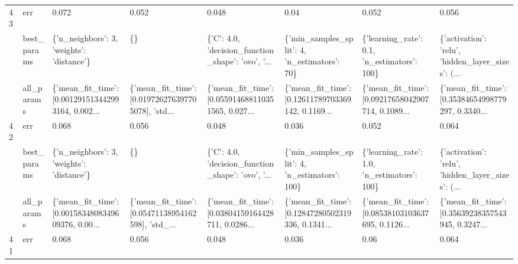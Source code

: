 \begin{tabular}{llllllll}
43 & err &                                              0.072 &                                              0.052 &                                              0.048 &                                               0.04 &                                              0.052 &                                              0.056 \\
   & best\_params &          \{'n\_neighbors': 3, 'weights': 'distance'\} &                                                 \{\} &  \{'C': 4.0, 'decision\_function\_shape': 'ovo', '... &       \{'min\_samples\_split': 4, 'n\_estimators': 70\} &        \{'learning\_rate': 0.1, 'n\_estimators': 100\} &  \{'activation': 'relu', 'hidden\_layer\_sizes': (... \\
   & all\_params &  \{'mean\_fit\_time': [0.001291513442993164, 0.002... &  \{'mean\_fit\_time': [0.019726276397705078], 'std... &  \{'mean\_fit\_time': [0.055914688110351565, 0.027... &  \{'mean\_fit\_time': [0.12611789703369142, 0.1169... &  \{'mean\_fit\_time': [0.09217658042907714, 0.1089... &  \{'mean\_fit\_time': [0.35384654998779297, 0.3340... \\
42 & err &                                              0.068 &                                              0.056 &                                              0.048 &                                              0.036 &                                              0.052 &                                              0.064 \\
   & best\_params &          \{'n\_neighbors': 3, 'weights': 'distance'\} &                                                 \{\} &  \{'C': 4.0, 'decision\_function\_shape': 'ovo', '... &      \{'min\_samples\_split': 4, 'n\_estimators': 100\} &        \{'learning\_rate': 1.0, 'n\_estimators': 100\} &  \{'activation': 'relu', 'hidden\_layer\_sizes': (... \\
   & all\_params &  \{'mean\_fit\_time': [0.0015834808349609376, 0.00... &  \{'mean\_fit\_time': [0.05471138954162598], 'std\_... &  \{'mean\_fit\_time': [0.03804159164428711, 0.0286... &  \{'mean\_fit\_time': [0.12847280502319336, 0.1341... &  \{'mean\_fit\_time': [0.08538103103637695, 0.1126... &  \{'mean\_fit\_time': [0.35639238357543945, 0.3247... \\
41 & err &                                              0.068 &                                              0.056 &                                              0.048 &                                              0.036 &                                               0.06 &                                              0.064 \\

\end{tabular}

